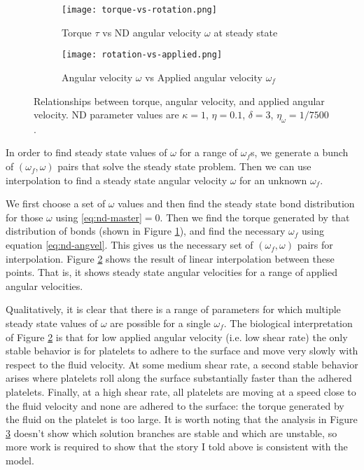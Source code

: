 \documentclass{article}
\begin{document}
\begin{figure}
  \centering
  \begin{subfigure}{.48\textwidth}
    \texttt{[image: torque-vs-rotation.png]}
    \caption{Torque $\tau$ vs ND angular velocity $\omega$ at steady
      state}
    \label{fig:tau-vs-omega}
  \end{subfigure}
  \hfill
  \begin{subfigure}{.48\textwidth}
    \texttt{[image: rotation-vs-applied.png]}
    \caption{Angular velocity $\omega$ vs Applied angular velocity
      $\omega_f$}
    \label{fig:omega-vs-omega_f}
  \end{subfigure}
  \caption{Relationships between torque, angular velocity, and applied
  angular velocity. ND parameter values are $\kappa = 1$, $\eta =
  0.1$, $\delta = 3$, $\eta_\omega = 1/7500$.}
  \label{fig:steady-state-rolling}
\end{figure}

In order to find steady state values of $\omega$ for a range of
$\omega_f$s, we generate a bunch of $(\omega_f, \omega)$ pairs that
solve the steady state problem. Then we can use interpolation to find
a steady state angular velocity $\omega$ for an unknown $\omega_f$. 

We first choose a set of $\omega$ values and then find the steady
state bond distribution for those $\omega$ using \eqref{eq:nd-master}$=
0$. Then we find the torque generated by that distribution of bonds
(shown in Figure \ref{fig:tau-vs-omega}), and find the necessary
$\omega_f$ using equation \eqref{eq:nd-angvel}. This gives us the
necessary set of $(\omega_f, \omega)$ pairs for interpolation. Figure
\ref{fig:omega-vs-omega_f} shows the result of linear interpolation
between these points. That is, it shows steady state angular
velocities for a range of applied angular velocities. 

Qualitatively, it is clear that there is a range of parameters for
which multiple steady state values of $\omega$ are possible for a
single $\omega_f$. The biological interpretation of Figure
\ref{fig:omega-vs-omega_f} is that for low applied angular velocity
(i.e. low shear rate) the only stable behavior is for platelets to
adhere to the surface and move very slowly with respect to the fluid
velocity. At some medium shear rate, a second stable behavior arises
where platelets roll along the surface substantially faster than the
adhered platelets. Finally, at a high shear rate, all platelets are
moving at a speed close to the fluid velocity and none are adhered to
the surface: the torque generated by the fluid on the platelet is too
large. It is worth noting that the analysis in Figure
\ref{fig:steady-state-rolling} doesn't show which solution branches
are stable and which are unstable, so more work is required to show
that the story I told above is consistent with the model. 
\end{document}

